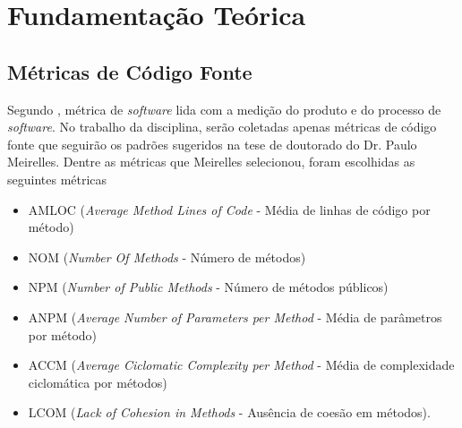 \chapter[Fundamentação Teórica]{Fundamentação Teórica}

\section{Métricas de Código Fonte}

Segundo , métrica de \textit{software} lida com a medição do produto e do processo de \textit{software}. No trabalho da disciplina, serão coletadas apenas métricas de código fonte que seguirão os padrões sugeridos na tese de doutorado do Dr. Paulo Meirelles. Dentre as métricas que Meirelles selecionou, foram escolhidas as seguintes métricas

\begin{itemize}
\item AMLOC (\textit{Average Method Lines of Code} - Média de linhas de código por método)
\item NOM (\textit{Number Of Methods} - Número de métodos)
\item NPM (\textit{Number of Public Methods} - Número de métodos públicos)
\item ANPM (\textit{Average Number of Parameters per Method} - Média de parâmetros por método)
\item ACCM (\textit{Average Ciclomatic Complexity per Method} - Média de complexidade ciclomática por métodos)
\item LCOM (\textit{Lack of Cohesion in Methods} - Ausência de coesão em métodos). 
\end{itemize}
